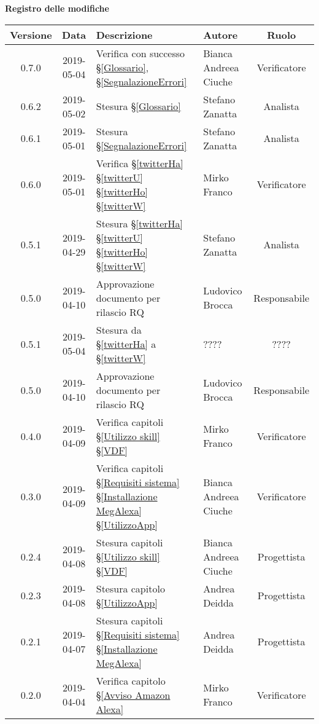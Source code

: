 	\begin{center}
		\textbf{Registro delle modifiche}
	\end{center}
	\begin{center}
		\begin{tabularx}{\textwidth}{|c|c|X|X|c|}
			\hline
			\textbf{Versione} & \textbf{Data} & \textbf{Descrizione} & \textbf{Autore} & \textbf{Ruolo} \\
			\hline
		    0.7.0 & 2019-05-04& Verifica con successo \S\ref{Glossario}, \S\ref{SegnalazioneErrori}  &Bianca Andreea Ciuche &Verificatore\\
			\hline
			0.6.2 & 2019-05-02& Stesura \S\ref{Glossario} & Stefano Zanatta & Analista \\
			\hline
			0.6.1 & 2019-05-01& Stesura \S\ref{SegnalazioneErrori}& Stefano Zanatta & Analista \\
			\hline
		    0.6.0 & 2019-05-01& Verifica  \S\ref{twitterHa} \S\ref{twitterU} \S\ref{twitterHo} \S\ref{twitterW}& Mirko Franco  & Verificatore \\
			\hline
			0.5.1 & 2019-04-29& Stesura \S\ref{twitterHa} \S\ref{twitterU} \S\ref{twitterHo} \S\ref{twitterW} & Stefano Zanatta & Analista \\
			\hline
			0.5.0 & 2019-04-10& Approvazione documento per rilascio RQ & Ludovico Brocca & Responsabile \\
			\hline
			0.5.1 & 2019-05-04 & Stesura da \S\ref{twitterHa} a \S\ref{twitterW} & ???? & ???? \\
			\hline
			0.5.0 & 2019-04-10 & Approvazione documento per rilascio RQ & Ludovico Brocca & Responsabile \\
			\hline
			0.4.0 & 2019-04-09 & Verifica capitoli \S\ref{Utilizzo skill}  \S\ref{VDF}  & Mirko Franco & Verificatore \\
			\hline
			0.3.0 & 2019-04-09 & Verifica capitoli \S\ref{Requisiti sistema}  \S\ref{Installazione MegAlexa}  \S\ref{UtilizzoApp}  & Bianca Andreea Ciuche & Verificatore \\
			\hline
			0.2.4 & 2019-04-08 & Stesura capitoli \S\ref{Utilizzo skill}  \S\ref{VDF}  & Bianca Andreea Ciuche & Progettista \\
			\hline
			0.2.3 & 2019-04-08 & Stesura capitolo \S\ref{UtilizzoApp} & Andrea Deidda & Progettista \\
			\hline
			0.2.1 & 2019-04-07 & Stesura capitoli \S\ref{Requisiti sistema}  \S\ref{Installazione MegAlexa}  & Andrea Deidda & Progettista \\
			\hline
			0.2.0 & 2019-04-04 &Verifica capitolo \S\ref{Avviso Amazon Alexa} & Mirko Franco  & Verificatore\\

\end{tabularx}
\end{center}
